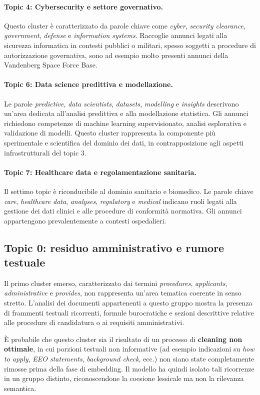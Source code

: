\paragraph{Topic 4: Cybersecurity e settore governativo.}
Questo cluster è caratterizzato da parole chiave come \emph{cyber},
\emph{security clearance}, \emph{government}, \emph{defense} e \emph{information systems}.
Raccoglie annunci legati alla sicurezza informatica in contesti pubblici o militari,
spesso soggetti a procedure di autorizzazione governativa, sono ad esempio molto presenti annunci della Vandenberg Space Force Base.

\paragraph{Topic 6: Data science predittiva e modellazione.}
Le parole \emph{predictive}, \emph{data scientists}, \emph{datasets}, \emph{modelling}
e \emph{insights} descrivono un’area dedicata all’analisi predittiva e alla modellazione statistica.
Gli annunci richiedono competenze di machine learning supervisionato,
analisi esplorativa e validazione di modelli.
Questo cluster rappresenta la componente più sperimentale e scientifica
del dominio dei dati, in contrapposizione agli aspetti infrastrutturali
del topic 3.

\paragraph{Topic 7: Healthcare data e regolamentazione sanitaria.}
Il settimo topic è riconducibile al dominio sanitario e biomedico.
Le parole chiave \emph{care}, \emph{healthcare data}, \emph{analyses},
\emph{regulatory} e \emph{medical} indicano ruoli legati alla gestione dei dati clinici
e alle procedure di conformità normativa.
Gli annunci appartengono prevalentemente a contesti ospedalieri.
\subsection{Topic 0: residuo amministrativo e rumore testuale}
Il primo cluster emerso, caratterizzato dai termini \emph{procedures}, \emph{applicants}, \emph{administrative} e \emph{provides}, non rappresenta un’area tematica coerente in senso stretto.
L’analisi dei documenti appartenenti a questo gruppo mostra la presenza di frammenti testuali ricorrenti, formule burocratiche e sezioni descrittive relative alle procedure di candidatura o ai requisiti amministrativi.

È probabile che questo cluster sia il risultato di un processo di \textbf{cleaning non ottimale}, in cui porzioni testuali non informative (ad esempio indicazioni su \emph{how to apply}, \emph{EEO statements}, \emph{background check}, ecc.) non siano state completamente rimosse prima della fase di embedding.
Il modello ha quindi isolato tali ricorrenze in un gruppo distinto, riconoscendone la coesione lessicale ma non la rilevanza semantica.

